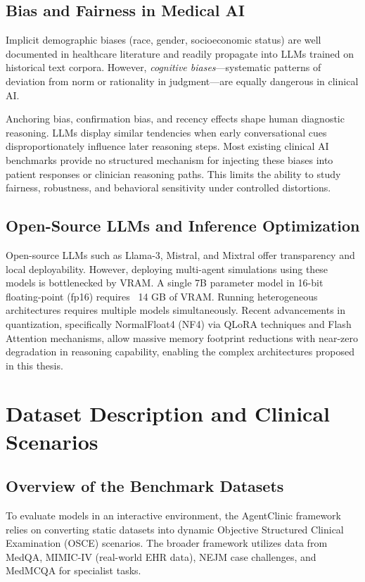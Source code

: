 \documentclass[12pt, a4paper, twoside]{report}
\begin{document}
\section{Bias and Fairness in Medical AI}
Implicit demographic biases (race, gender, socioeconomic status) are well documented in healthcare literature and readily propagate into LLMs trained on historical text corpora. However, \textit{cognitive biases}—systematic patterns of deviation from norm or rationality in judgment—are equally dangerous in clinical AI. 

Anchoring bias, confirmation bias, and recency effects shape human diagnostic reasoning. LLMs display similar tendencies when early conversational cues disproportionately influence later reasoning steps. Most existing clinical AI benchmarks provide no structured mechanism for injecting these biases into patient responses or clinician reasoning paths. This limits the ability to study fairness, robustness, and behavioral sensitivity under controlled distortions.

\section{Open-Source LLMs and Inference Optimization}
Open-source LLMs such as Llama-3, Mistral, and Mixtral offer transparency and local deployability. However, deploying multi-agent simulations using these models is bottlenecked by VRAM. A single 7B parameter model in 16-bit floating-point (fp16) requires ~14 GB of VRAM. Running heterogeneous architectures requires multiple models simultaneously. Recent advancements in quantization, specifically NormalFloat4 (NF4) via QLoRA techniques and Flash Attention mechanisms, allow massive memory footprint reductions with near-zero degradation in reasoning capability, enabling the complex architectures proposed in this thesis.

\chapter{Dataset Description and Clinical Scenarios}

\section{Overview of the Benchmark Datasets}
To evaluate models in an interactive environment, the AgentClinic framework relies on converting static datasets into dynamic Objective Structured Clinical Examination (OSCE) scenarios. The broader framework utilizes data from MedQA, MIMIC-IV (real-world EHR data), NEJM case challenges, and MedMCQA for specialist tasks. 
\end{document}
